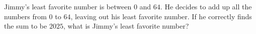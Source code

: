 Jimmy's least favorite number is between $0$ and $64$. He decides to add up all the numbers from $0$ to $64$, leaving out his least favorite number. If he correctly finds the sum to be $2025$, what is Jimmy's least favorite number?
